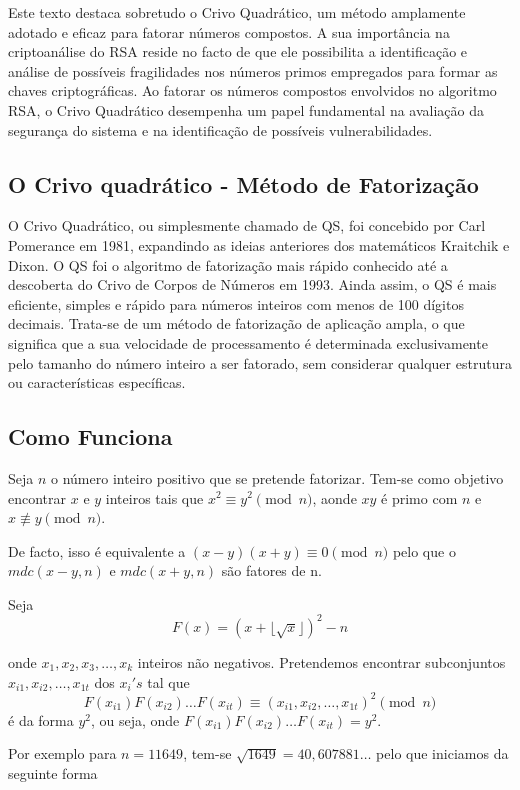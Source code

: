 Este texto destaca sobretudo o Crivo Quadrático, um método amplamente adotado e eficaz para fatorar números compostos. A sua importância na criptoanálise do RSA reside no facto de que ele possibilita a identificação e análise de possíveis fragilidades nos números primos empregados para formar as chaves criptográficas. Ao fatorar os números compostos envolvidos no algoritmo RSA, o Crivo Quadrático desempenha um papel fundamental na avaliação da segurança do sistema e na identificação de possíveis vulnerabilidades.

\subsection{O Crivo quadrático - Método de Fatorização}

O Crivo Quadrático, ou simplesmente chamado de QS, foi concebido por Carl Pomerance em 1981, expandindo as ideias anteriores dos matemáticos Kraitchik e Dixon. O QS foi o algoritmo de fatorização mais rápido conhecido até a descoberta do Crivo de Corpos de Números em 1993. Ainda assim, o QS é mais eficiente, simples e rápido para números inteiros com menos de 100 dígitos decimais. Trata-se de um método de fatorização de aplicação ampla, o que significa que a sua velocidade de processamento é determinada exclusivamente pelo tamanho do número inteiro a ser fatorado, sem considerar qualquer estrutura ou características específicas.

\subsection{Como Funciona}

Seja $n$ o número inteiro positivo que se pretende fatorizar. Tem-se como objetivo encontrar $x$ e $y$ inteiros tais que $x^2 \equiv y^2\pmod{n}$, aonde $xy$ é primo com $n$ e $x \not\equiv y \pmod{n}$.

De facto, isso é equivalente a $(x-y)(x+y) \equiv 0 \pmod{n}$ pelo que  o $mdc(x-y,n)$ e $mdc(x+y,n)$ são fatores de n.

Seja $$F(x)=(x+\lfloor \sqrt x \rfloor)^2 -n $$

onde   $x_1,x_2,x_3,\ldots,x_k$ inteiros não negativos. Pretendemos encontrar subconjuntos $x_{i1},x_{i2},\dots,x_{1t}$ dos $x_i's$ tal que 
$$F(x_{i1})F(x_{i2})\ldots F(x_{it})\equiv (x_{i1},x_{i2},\dots,x_{1t})^2\pmod n$$ é da forma $y^2$, ou seja,
onde $F(x_{i1})F(x_{i2})\ldots F(x_{it})=y^2.$


Por exemplo para $n=11649$, tem-se $\sqrt{1649}=40,607881…$ pelo que iniciamos da seguinte forma 

